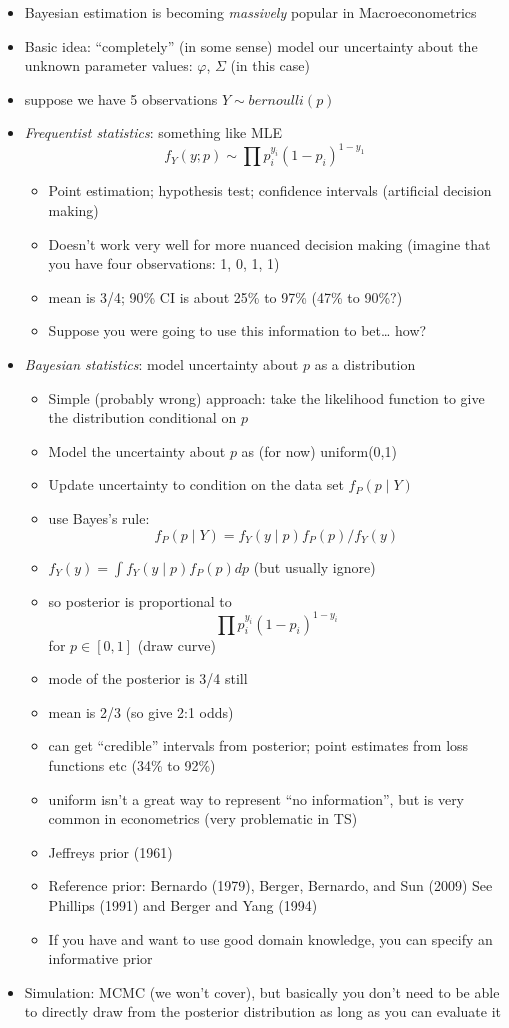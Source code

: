 \begin{itemize}
\item Bayesian estimation is becoming \emph{massively} popular in
  Macroeconometrics
\item Basic idea: ``completely'' (in some sense) model our uncertainty
  about the unknown parameter values: $φ$, $Σ$ (in this case)
\item suppose we have 5 observations $Y ∼ bernoulli(p)$
\item \emph{Frequentist statistics}: something like MLE
  \[f_Y(y; p) ∼ ∏ p_i^{y_i} (1 - p_i)^{1 - y_1}\]
  \begin{itemize}
  \item Point estimation; hypothesis test; confidence intervals
    (artificial decision making)
  \item Doesn't work very well for more nuanced decision making
    (imagine that you have four observations: 1, 0, 1, 1)
  \item mean is 3/4; 90\% CI is about 25\% to 97\% (47\% to 90\%?)
  \item Suppose you were going to use this information to bet… how?
  \end{itemize}
\item \emph{Bayesian statistics}: model uncertainty about $p$ as a
  distribution
  \begin{itemize}
  \item Simple (probably wrong) approach: take the likelihood function
    to give the distribution conditional on $p$
  \item Model the uncertainty about $p$ as (for now) uniform(0,1)
  \item Update uncertainty to condition on the data set $f_P(p ∣ Y)$
  \item use Bayes's rule:
    \[f_P(p ∣ Y) = f_Y(y ∣ p) f_P(p) / f_Y(y)\]
  \item $f_Y(y) = ∫ f_Y(y ∣ p) f_P(p) dp$ (but usually ignore)
  \item so posterior is proportional to 
    \[∏ p_i^{y_i} (1 - p_i)^{1 - y_i}\] for $p ∈ [0,1]$ (draw curve)
  \item mode of the posterior is 3/4 still
  \item mean is 2/3 (so give 2:1 odds)
  \item can get ``credible'' intervals from posterior; point estimates
    from loss functions etc (34\% to 92\%)
  \item uniform isn't a great way to represent ``no information'', but
    is very common in econometrics (very problematic in TS)
  \item Jeffreys prior (1961)
  \item Reference prior: Bernardo (1979), Berger, Bernardo, and Sun
    (2009) See Phillips (1991) and Berger and Yang (1994)
  \item If you have and want to use good domain knowledge, you can
    specify an informative prior
  \end{itemize}
\item Simulation: MCMC (we won't cover), but basically you don't need
  to be able to directly draw from the posterior distribution as long
  as you can evaluate it
\end{itemize}

